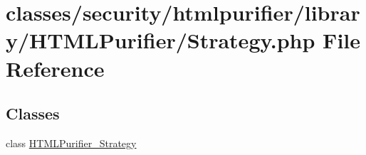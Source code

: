 \hypertarget{Strategy_8php}{\section{classes/security/htmlpurifier/library/\+H\+T\+M\+L\+Purifier/\+Strategy.php File Reference}
\label{Strategy_8php}
}
\subsection*{Classes}
\begin{DoxyCompactItemize}
\item 
class \hyperlink{classHTMLPurifier__Strategy}{H\+T\+M\+L\+Purifier\+\_\+\+Strategy}
\end{DoxyCompactItemize}

